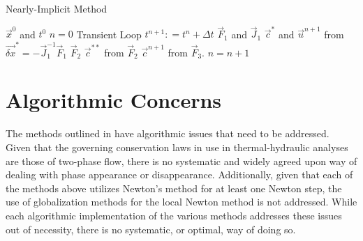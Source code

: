 \begin{algo}[H]
\caption{Nearly-Implicit Method}
\label{alg:ni}
\setlength{\baselineskip}{0.625\baselineskip}
\begin{algorithmic}[1]
\Require $\vec{x}^{0}$ and $t^{0}$
\Set $n = 0$
\Loop \; Transient Loop
    \State $t^{n+1} : = t^{n} + \Delta t$
	\Calculate $\vec{F}_1$ and $\vec{J}_1$
	\Calculate $\vec{c}^{*}$ and $\vec{u}^{n+1}$ from $\vec{\delta x}^{*} = -\vec{J}^{-1}_1\vec{F}_1$
	\Calculate $\vec{F}_2$
	\Calculate $\vec{c}^{**}$ from $\vec{F}_2$
	\Calculate $\vec{c}^{n+1}$ from $\vec{F}_3$.
	\State $n = n + 1$
\EndLoop
\end{algorithmic}
\end{algo}


\section{Algorithmic Concerns}
\label{sect:algorithmic_concerns}
The methods outlined in  have algorithmic issues that need to be addressed.
Given that the governing conservation laws in use in thermal-hydraulic analyses are those of two-phase flow, there is no systematic and widely agreed upon way of dealing with phase appearance or disappearance.
Additionally, given that each of the methods above utilizes Newton's method for at least one Newton step, the use of globalization methods for the local Newton method is not addressed.
While each algorithmic implementation of the various methods addresses these issues out of necessity, there is no systematic, or optimal, way of doing so. 

